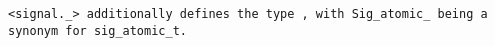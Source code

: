 \tt{<signal._>} additionally defines the type ,
with \tt{Sig_atomic_} being a synonym for \tt{sig_atomic_t}.
